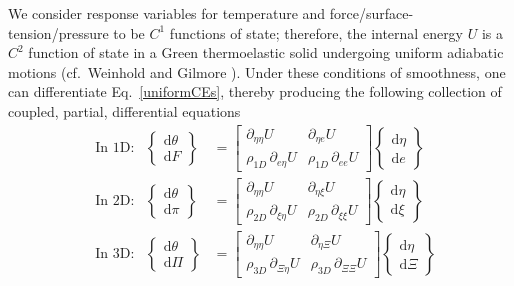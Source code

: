 We consider response variables for temperature and force\slash surface-tension\slash pressure to be $C^1$ functions of state; therefore, the internal energy $U$ is a $C^2$ function of state in a Green thermo\-elastic solid undergoing uniform adiabatic motions (cf.\ Weinhold \cite{Weinhold75c} and Gilmore \cite{Gilmore84}).  Under these conditions of smoothness, one can differentiate Eq.~\ref{uniformCEs}, thereby producing the following collection of coupled, partial, differential equations
\begin{subequations}
    \label{GreenElasticODEs}
    \begin{align}
    \mbox{} & \text{In 1D:} &
    \left\{ \begin{matrix} \mathrm{d} \theta \\ 
    \mathrm{d} F \end{matrix} \right\} & = \begin{bmatrix}
    \partial_{\eta\eta} U & \partial_{\eta e} U \\
    \rho_{1D} \, \partial_{e \eta} U & \rho_{1D} \, \partial_{ee} U \end{bmatrix} 
    \left\{ \begin{matrix} \mathrm{d} \eta \\
    \mathrm{d} e \end{matrix} \right\} \\
    \mbox{} & \text{In 2D:} &
    \left\{ \begin{matrix} \mathrm{d} \theta \\ 
    \mathrm{d} \pi \end{matrix} \right\} & = \begin{bmatrix}
    \partial_{\eta\eta} U & \partial_{\eta \xi} U \\
    \rho_{2D} \, \partial_{\xi\eta} U & \rho_{2D} \, \partial_{\xi\xi} U \end{bmatrix} \left\{ \begin{matrix} \mathrm{d} \eta \\
    \mathrm{d} \xi \end{matrix} \right\} \label{GreenMembrane} \\
    \mbox{} & \text{In 3D:} &
    \left\{ \begin{matrix} \mathrm{d} \theta \\ 
    \mathrm{d} \Pi \end{matrix} \right\} & = \begin{bmatrix}
    \partial_{\eta\eta} U & \partial_{\eta\Xi} U \\
    \rho_{3D} \, \partial_{\Xi \eta} U & \rho_{3D} \, \partial_{\Xi\Xi} U \end{bmatrix} \left\{ \begin{matrix} \mathrm{d} \eta \\
    \mathrm{d} \Xi \end{matrix} \right\} \label{GreenSolid}
    \end{align}
\end{subequations}
